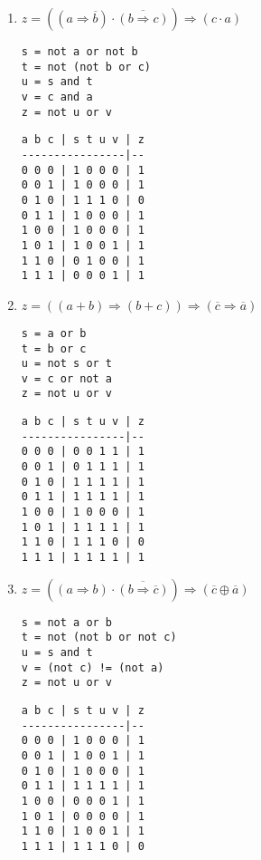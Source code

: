 \documentclass[11pt,a4paper]{article}
\begin{document}
\begin{enumerate}
\item $z = ((a \Rightarrow \overline{b}) \cdot \overline{(b \Rightarrow c)}) \Rightarrow ({c} \cdot {a})$
\hfill
\begin{minipage}[t]{4cm}\footnotesize
\begin{Verbatim}
s = not a or not b
t = not (not b or c)
u = s and t
v = c and a
z = not u or v
\end{Verbatim}
\end{minipage}
\hspace*{3mm}
\begin{minipage}[t]{3.5cm}\footnotesize
\begin{Verbatim}
a b c | s t u v | z
----------------|--
0 0 0 | 1 0 0 0 | 1
0 0 1 | 1 0 0 0 | 1
0 1 0 | 1 1 1 0 | 0
0 1 1 | 1 0 0 0 | 1
1 0 0 | 1 0 0 0 | 1
1 0 1 | 1 0 0 1 | 1
1 1 0 | 0 1 0 0 | 1
1 1 1 | 0 0 0 1 | 1
\end{Verbatim}
\end{minipage}
\vspace*{3mm}

\item $z = ((a + b) \Rightarrow (b + c)) \Rightarrow (\overline{c} \Rightarrow \overline{a})$
\hfill
\begin{minipage}[t]{4cm}\footnotesize
\begin{Verbatim}
s = a or b
t = b or c
u = not s or t
v = c or not a
z = not u or v
\end{Verbatim}
\end{minipage}
\hspace*{3mm}
\begin{minipage}[t]{3.5cm}\footnotesize
\begin{Verbatim}
a b c | s t u v | z
----------------|--
0 0 0 | 0 0 1 1 | 1
0 0 1 | 0 1 1 1 | 1
0 1 0 | 1 1 1 1 | 1
0 1 1 | 1 1 1 1 | 1
1 0 0 | 1 0 0 0 | 1
1 0 1 | 1 1 1 1 | 1
1 1 0 | 1 1 1 0 | 0
1 1 1 | 1 1 1 1 | 1
\end{Verbatim}
\end{minipage}
\vspace*{3mm}

\item $z = ({(a \Rightarrow b)} \cdot \overline{(b \Rightarrow \overline{c})}) \Rightarrow (\overline{c} \oplus \overline{a})$ 
\hfill
\begin{minipage}[t]{4cm}\footnotesize
\begin{Verbatim}
s = not a or b
t = not (not b or not c)
u = s and t
v = (not c) != (not a)
z = not u or v
\end{Verbatim}
\end{minipage}
\hspace*{3mm}
\begin{minipage}[t]{3.5cm}\footnotesize
\begin{Verbatim}
a b c | s t u v | z
----------------|--
0 0 0 | 1 0 0 0 | 1
0 0 1 | 1 0 0 1 | 1
0 1 0 | 1 0 0 0 | 1
0 1 1 | 1 1 1 1 | 1
1 0 0 | 0 0 0 1 | 1
1 0 1 | 0 0 0 0 | 1
1 1 0 | 1 0 0 1 | 1
1 1 1 | 1 1 1 0 | 0
\end{Verbatim}
\end{minipage}
\vspace*{3mm}

\end{enumerate}

\end{document}
